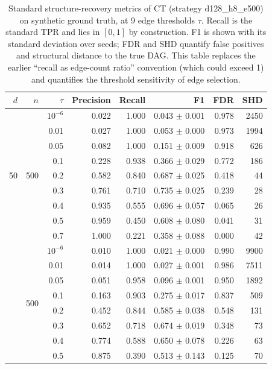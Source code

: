 \documentclass[12pt,a4paper]{article}
\begin{document}
\begin{table}[H]
\centering
\caption{Standard structure-recovery metrics of CT (strategy d128\_h8\_e500) on synthetic ground truth, at 9 edge thresholds $\tau$. Recall is the standard TPR and lies in $[0,1]$ by construction. F1 is shown with its standard deviation over seeds; FDR and SHD quantify false positives and structural distance to the true DAG. This table replaces the earlier ``recall as edge-count ratio'' convention (which could exceed 1) and quantifies the threshold sensitivity of edge selection.}
\label{tab:std_metrics}
\begin{tabular}{rrrrrrrr}
\toprule
$d$ & $n$ & $\tau$ & Precision & Recall & F1 & FDR & SHD \\
\midrule
\multirow{9}{*}{50} & \multirow{9}{*}{500} & $10^{-6}$ & 0.022 & 1.000 & 0.043 $\pm$ 0.001 & 0.978 & 2450 \\
 & & 0.01 & 0.027 & 1.000 & 0.053 $\pm$ 0.000 & 0.973 & 1994 \\
 & & 0.05 & 0.082 & 1.000 & 0.151 $\pm$ 0.009 & 0.918 & 626 \\
 & & 0.1 & 0.228 & 0.938 & 0.366 $\pm$ 0.029 & 0.772 & 186 \\
 & & 0.2 & 0.582 & 0.840 & 0.687 $\pm$ 0.025 & 0.418 & 44 \\
 & & 0.3 & 0.761 & 0.710 & 0.735 $\pm$ 0.025 & 0.239 & 28 \\
 & & 0.4 & 0.935 & 0.555 & 0.696 $\pm$ 0.057 & 0.065 & 26 \\
 & & 0.5 & 0.959 & 0.450 & 0.608 $\pm$ 0.080 & 0.041 & 31 \\
 & & 0.7 & 1.000 & 0.221 & 0.358 $\pm$ 0.088 & 0.000 & 42 \\
\addlinespace
\multirow{9}{*}{100} & \multirow{9}{*}{500} & $10^{-6}$ & 0.010 & 1.000 & 0.021 $\pm$ 0.000 & 0.990 & 9900 \\
 & & 0.01 & 0.014 & 1.000 & 0.027 $\pm$ 0.001 & 0.986 & 7511 \\
 & & 0.05 & 0.051 & 0.958 & 0.096 $\pm$ 0.001 & 0.950 & 1892 \\
 & & 0.1 & 0.163 & 0.903 & 0.275 $\pm$ 0.017 & 0.837 & 509 \\
 & & 0.2 & 0.452 & 0.844 & 0.585 $\pm$ 0.038 & 0.548 & 131 \\
 & & 0.3 & 0.652 & 0.718 & 0.674 $\pm$ 0.019 & 0.348 & 73 \\
 & & 0.4 & 0.774 & 0.588 & 0.650 $\pm$ 0.078 & 0.226 & 63 \\
 & & 0.5 & 0.875 & 0.390 & 0.513 $\pm$ 0.143 & 0.125 & 70 \\

\end{tabular}
\end{table}
\end{document}
